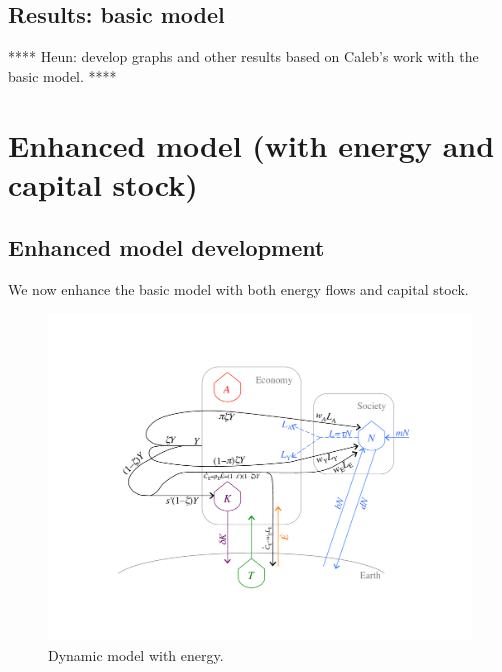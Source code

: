 \documentclass[letterpaper,12pt]{article}
\begin{document}
\subsection{Results: basic model}
\label{sec:Results_basic_model}

**** Heun: develop graphs and other results based on Caleb's work with the basic model. ****


\section{Enhanced model (with energy and capital stock)}
\label{sec:Enhanced_model}

\subsection{Enhanced model development}
\label{sec:enhanced_model_development}

We now enhance the basic model with both energy flows and capital stock.

\begin{figure} \label{fig:ModelWithEnergy}
  \begin{center}
    \includegraphics[width=\textwidth]{figure_other/ModelWithEnergy.pdf}
    \caption{Dynamic model with energy.}
  \end{center}
\end{figure}
\end{document}
